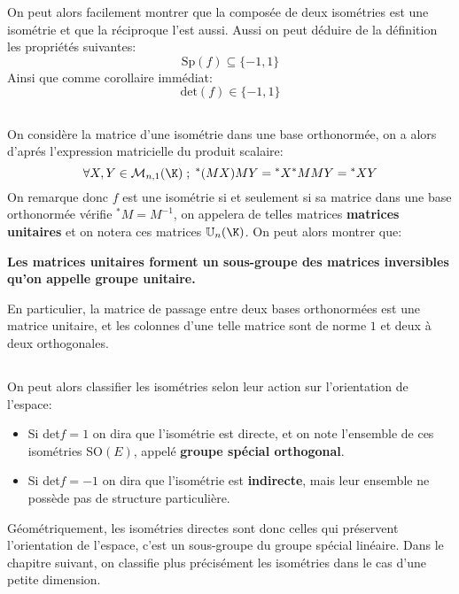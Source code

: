 On peut alors facilement montrer que la composée de deux isométries est une isométrie et que la réciproque l'est aussi. Aussi on peut déduire de la définition les propriétés suivantes:
\[
   \text{Sp}(f) \subseteq \{-1, 1\}   
\]
Ainsi que comme corollaire immédiat:
\[
   \text{det}(f) \in \{-1, 1\}
\]
\subsection*{}
On considère la matrice d'une isométrie dans une base orthonormée, on a alors d'aprés l'expression matricielle du produit scalaire:
\[
   \forall X, Y \in \mathcal{M}_{n, 1}(\K) \; ; \; {}^*(MX)MY = {}^*X{}^*MMY = {}^*XY  
\]
On remarque donc \(f\) est une isométrie si et seulement si sa matrice dans une base orthonormée vérifie \({}^*M = M^{-1}\), on appelera de telles matrices \textbf{matrices unitaires} et on notera ces matrices \(\mathbb{U}_n(\K)\). On peut alors montrer que:
\begin{center}
   \textbf{Les matrices unitaires forment un sous-groupe des matrices inversibles qu'on appelle groupe unitaire.}
\end{center}
En particulier, la matrice de passage entre deux bases orthonormées est une matrice unitaire, et les colonnes d'une telle matrice sont de norme \(1\) et deux à deux orthogonales.
\subsection*{}
On peut alors classifier les isométries selon leur action sur l'orientation de l'espace:
\begin{itemize}
   \item Si det\(f = 1\) on dira que l'isométrie est directe, et on note l'ensemble de ces isométries SO\((E)\), appelé \textbf{groupe spécial orthogonal}.
   \item Si det\(f = -1\) on dira que l'isométrie est \textbf{indirecte}, mais leur ensemble ne possède pas de structure particulière.
\end{itemize}
Géométriquement, les isométries directes sont donc celles qui préservent l'orientation de l'espace, c'est un sous-groupe du groupe spécial linéaire. Dans le chapitre suivant, on classifie plus précisément les isométries dans le cas d'une petite dimension.
\pagebreak
